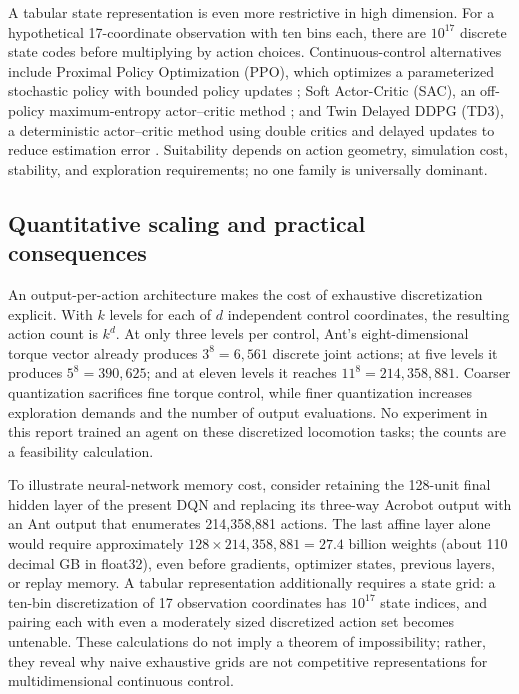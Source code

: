 \documentclass[conference,10pt]{IEEEtran}
\begin{document}
A tabular state representation is even more restrictive in high dimension. For a hypothetical 17-coordinate observation with ten bins each, there are $10^{17}$ discrete state codes before multiplying by action choices. Continuous-control alternatives include Proximal Policy Optimization (PPO), which optimizes a parameterized stochastic policy with bounded policy updates \cite{Schulman2017}; Soft Actor-Critic (SAC), an off-policy maximum-entropy actor--critic method \cite{Haarnoja2018}; and Twin Delayed DDPG (TD3), a deterministic actor--critic method using double critics and delayed updates to reduce estimation error \cite{Fujimoto2018}. Suitability depends on action geometry, simulation cost, stability, and exploration requirements; no one family is universally dominant.


\subsection{Quantitative scaling and practical consequences}
An output-per-action architecture makes the cost of exhaustive discretization explicit. With $k$ levels for each of $d$ independent control coordinates, the resulting action count is $k^d$. At only three levels per control, Ant's eight-dimensional torque vector already produces $3^8=6,561$ discrete joint actions; at five levels it produces $5^8=390,625$; and at eleven levels it reaches $11^8=214,358,881$. Coarser quantization sacrifices fine torque control, while finer quantization increases exploration demands and the number of output evaluations. No experiment in this report trained an agent on these discretized locomotion tasks; the counts are a feasibility calculation.

To illustrate neural-network memory cost, consider retaining the 128-unit final hidden layer of the present DQN and replacing its three-way Acrobot output with an Ant output that enumerates 214,358,881 actions. The last affine layer alone would require approximately $128\times214,358,881=27.4$ billion weights (about 110 decimal GB in float32), even before gradients, optimizer states, previous layers, or replay memory. A tabular representation additionally requires a state grid: a ten-bin discretization of 17 observation coordinates has $10^{17}$ state indices, and pairing each with even a moderately sized discretized action set becomes untenable. These calculations do not imply a theorem of impossibility; rather, they reveal why naive exhaustive grids are not competitive representations for multidimensional continuous control.
\end{document}
